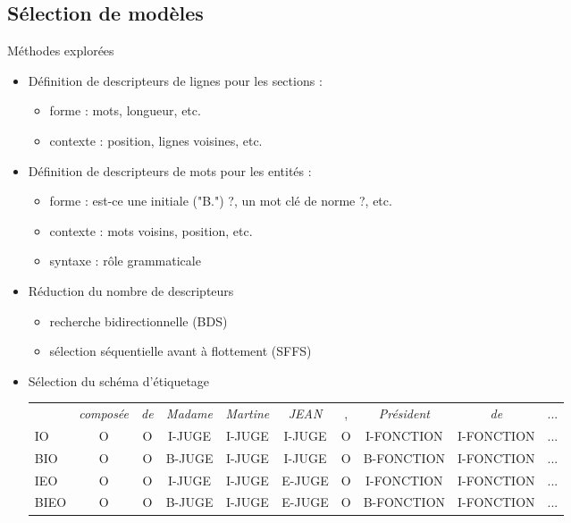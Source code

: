 \subsection{Sélection de modèles}
\begin{frame}[t]{\mysubsectiontitle}		
	Méthodes explorées
	
	\begin{itemize} \small
		\item Définition de descripteurs de lignes pour les sections : 
		 \begin{itemize}
			\item forme : mots, longueur, etc. 
			\item contexte : position, lignes voisines, etc.
		 \end{itemize}
		\item Définition de descripteurs de mots pour les entités : 
		\begin{itemize}
			\item forme : est-ce une initiale ("B.") ?,  un mot clé de norme ?, etc.
			\item contexte : mots voisins, position, etc.
			\item syntaxe : rôle grammaticale
		\end{itemize}	
	\item Réduction du nombre de descripteurs
	\begin{itemize}
		\item recherche bidirectionnelle (BDS) \cite{liu2012featureSelection}
		\item sélection séquentielle avant à flottement (SFFS) \cite{pudil1994floatingFeatSelection}
	\end{itemize}
		\item Sélection du schéma d'étiquetage {\tiny
		\begin{tabular}{l|ccccccccc}
			& \textit{composée} & \textit{de} & \textit{Madame} & \textit{Martine} & \textit{JEAN} & , & \textit{Président} & \textit{de} & ... \\ 
			IO & O & O & I-JUGE & I-JUGE & I-JUGE & O & I-FONCTION & I-FONCTION & ... \\
			BIO & O & O & B-JUGE & I-JUGE & I-JUGE & O & B-FONCTION & I-FONCTION & ... \\
			IEO & O & O & I-JUGE & I-JUGE & E-JUGE & O & I-FONCTION & I-FONCTION & ...\\
			BIEO & O & O & B-JUGE & I-JUGE & E-JUGE & O & B-FONCTION & I-FONCTION & ... \\
		\end{tabular}}
	\end{itemize}	
\end{frame}

